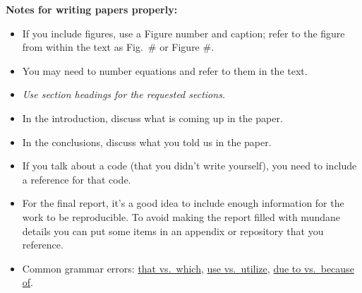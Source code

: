 \textbf{Notes for writing papers properly:}
\begin{itemize}
\item If you include figures, use a Figure number and caption; refer to the figure from within the text as Fig.\ \# or Figure \#.
\item You may need to number equations and refer to them in the text.
\item \textit{Use section headings for the requested sections.}
\item In the introduction, discuss what is coming up in the paper. 
\item In the conclusions, discuss what you told us in the paper.
\item If you talk about a code (that you didn't write yourself), you need to include a reference for that code. 
\item For the final report, it's a good idea to include enough information for the work to be reproducible. To avoid making the report filled with mundane details you can put some items in an appendix or repository that you reference.
\item Common grammar errors: \href{http://www.quickanddirtytips.com/education/grammar/which-versus-that-0}{that vs.\ which}, \href{http://grammarpartyblog.com/2012/01/17/use-versus-utilize/}{use vs.\ utilize}, \href{https://e-gmat.com/blog/gmat-verbal/sentence-correction/idioms/due-to-vs-because-of}{due to vs.\ because of}.
\end{itemize}